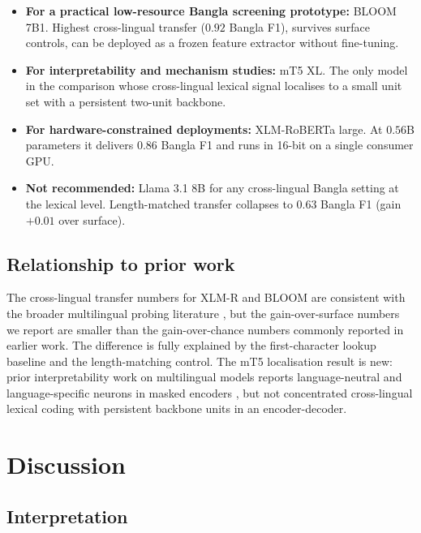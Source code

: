 \begin{itemize}
    \item \textbf{For a practical low-resource Bangla screening prototype:} BLOOM 7B1. Highest cross-lingual transfer ($0.92$ Bangla F1), survives surface controls, can be deployed as a frozen feature extractor without fine-tuning.
    \item \textbf{For interpretability and mechanism studies:} mT5 XL. The only model in the comparison whose cross-lingual lexical signal localises to a small unit set with a persistent two-unit backbone.
    \item \textbf{For hardware-constrained deployments:} XLM-RoBERTa large. At $0.56$B parameters it delivers $0.86$ Bangla F1 and runs in 16-bit on a single consumer GPU.
    \item \textbf{Not recommended:} Llama 3.1 8B for any cross-lingual Bangla setting at the lexical level. Length-matched transfer collapses to $0.63$ Bangla F1 (gain $+0.01$ over surface).
\end{itemize}

\subsection{Relationship to prior work}

The cross-lingual transfer numbers for XLM-R and BLOOM are consistent with the broader multilingual probing literature \cite{conneau2020xlmr,wu2020emerging,pires2019mbert}, but the gain-over-surface numbers we report are smaller than the gain-over-chance numbers commonly reported in earlier work. The difference is fully explained by the first-character lookup baseline and the length-matching control. The mT5 localisation result is new: prior interpretability work on multilingual models reports language-neutral and language-specific neurons in masked encoders \cite{stanczak2022neurons}, but not concentrated cross-lingual lexical coding with persistent backbone units in an encoder-decoder.

\section{Discussion}
\label{sec:discussion}

\subsection{Interpretation}

